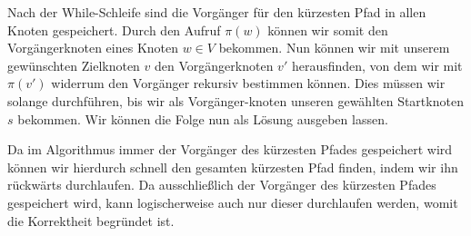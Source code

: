 \documentclass[ngerman,landscape,twocolumn]{adtexsheet}
\begin{document}
\begin{solution}
\begin{enumerate}
        Nach der While-Schleife sind die Vorgänger für den kürzesten Pfad in allen Knoten gespeichert. Durch den Aufruf $\pi (w)$ können wir somit den Vorgängerknoten eines Knoten $w \in V$ bekommen. Nun können wir mit unserem gewünschten Zielknoten $v$ den Vorgängerknoten $v'$ herausfinden, von dem wir mit $\pi (v')$ widerrum den Vorgänger rekursiv bestimmen können. Dies müssen wir solange durchführen, bis wir als Vorgänger-knoten unseren gewählten Startknoten $s$ bekommen. Wir können die Folge nun als Lösung ausgeben lassen.
        
        Da im Algorithmus immer der Vorgänger des kürzesten Pfades gespeichert wird können wir hierdurch schnell den gesamten kürzesten Pfad finden, indem wir ihn rückwärts durchlaufen. Da ausschließlich der Vorgänger des kürzesten Pfades gespeichert wird, kann logischerweise auch nur dieser durchlaufen werden, womit die Korrektheit begründet ist.
       
\end{enumerate}
\end{solution}
     
\end{document}
